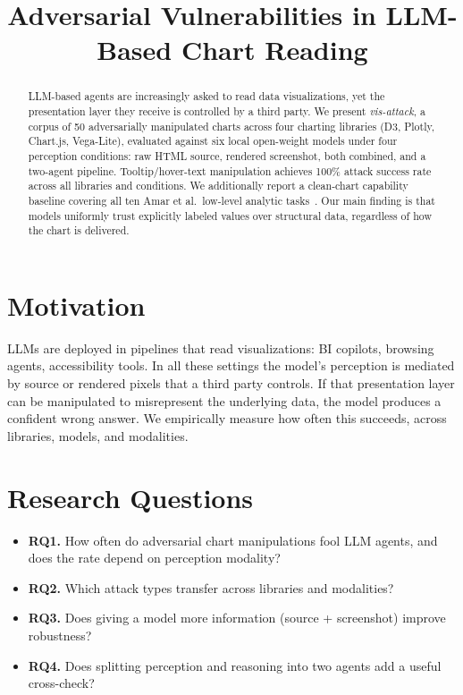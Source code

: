 \documentclass[conference]{IEEEtran}
\title{Adversarial Vulnerabilities in LLM-Based Chart Reading}
\author{
  \IEEEauthorblockN{\todo{Author}}
  \IEEEauthorblockA{\todo{Institution}}
}
\begin{document}
\maketitle

\begin{abstract}
LLM-based agents are increasingly asked to read data visualizations,
yet the presentation layer they receive is controlled by a third party.
We present \textit{vis-attack}, a corpus of 50 adversarially manipulated
charts across four charting libraries (D3, Plotly, Chart.js, Vega-Lite),
evaluated against six local open-weight models under four perception
conditions: raw HTML source, rendered screenshot, both combined, and a
two-agent pipeline. Tooltip/hover-text manipulation achieves 100\%
attack success rate across all libraries and conditions. We additionally
report a clean-chart capability baseline covering all ten Amar et al.\
low-level analytic tasks~\cite{amar2005}. Our main finding is that
models uniformly trust explicitly labeled values over structural data,
regardless of how the chart is delivered.
\end{abstract}

\section{Motivation}

LLMs are deployed in pipelines that read visualizations: BI copilots,
browsing agents, accessibility tools. In all these settings the
model's perception is mediated by source or rendered pixels that a
third party controls. If that presentation layer can be manipulated
to misrepresent the underlying data, the model produces a confident
wrong answer. We empirically measure how often this succeeds, across
libraries, models, and modalities.

\section{Research Questions}

\begin{itemize}
  \item \textbf{RQ1.} How often do adversarial chart manipulations
        fool LLM agents, and does the rate depend on perception
        modality?
  \item \textbf{RQ2.} Which attack types transfer across libraries
        and modalities?
  \item \textbf{RQ3.} Does giving a model more information
        (source + screenshot) improve robustness?
  \item \textbf{RQ4.} Does splitting perception and reasoning into
        two agents add a useful cross-check?
\end{itemize}
\end{document}

